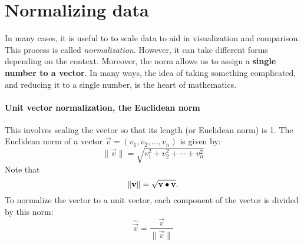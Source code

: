 \documentclass{ximera}
\begin{document}

\section{Normalizing data}

In many cases, it is useful to to scale data to aid in visualization
and comparison. This process is called
\textit{normalization}. However, it can take different forms depending
on the context. Moreover, the norm allows us to assign a
\textbf{single number to a vector}. In many ways, the idea of taking
something complicated, and reducing it to a single number, is the
heart of mathematics.



\paragraph{Unit vector normalization, the Euclidean norm}

This involves scaling the vector so that its length (or Euclidean
norm) is 1. The Euclidean norm of a vector \(\vec{v} = (v_1, v_2,
\ldots, v_n)\) is given by:
\[
\|\vec{v}\| = \sqrt{v_1^2 + v_2^2 + \cdots + v_n^2}
\]
Note that
\[
\|\mathbf{v}\| = \sqrt{\mathbf{v}\bullet\mathbf{v}}.
\]
To normalize the vector to a unit vector, each component of the vector is divided by this norm:
\[ \hat{\vec{v}} = \frac{\vec{v}}{\|\vec{v}\|} \]
\end{document}
